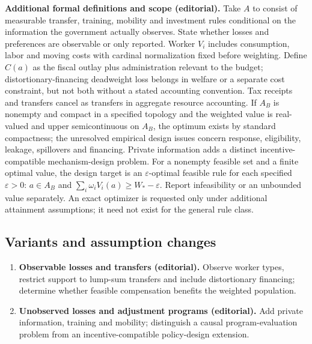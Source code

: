 \documentclass[11pt,a4paper]{article}
\begin{document}
\textbf{Additional formal definitions and scope (editorial).} Take \(A\) to consist of measurable transfer, training, mobility and investment rules conditional on the information the government actually observes. State whether losses and preferences are observable or only reported. Worker \(V_i\) includes consumption, labor and moving costs with cardinal normalization fixed before weighting. Define \(C(a)\) as the fiscal outlay plus administration relevant to the budget; distortionary-financing deadweight loss belongs in welfare or a separate cost constraint, but not both without a stated accounting convention. Tax receipts and transfers cancel as transfers in aggregate resource accounting. If \(A_B\) is nonempty and compact in a specified topology and the weighted value is real-valued and upper semicontinuous on \(A_B\), the optimum exists by standard compactness; the unresolved empirical design issues concern response, eligibility, leakage, spillovers and financing. Private information adds a distinct incentive-compatible mechanism-design problem. For a nonempty feasible set and a finite optimal value, the design target is an \(\varepsilon\)-optimal feasible rule for each specified \(\varepsilon>0\): \(a\in A_B\) and \(\sum_i\omega_iV_i(a)\geq W_*-\varepsilon\). Report infeasibility or an unbounded value separately. An exact optimizer is requested only under additional attainment assumptions; it need not exist for the general rule class.
\subsection*{Variants and assumption changes}
\begin{enumerate}
\item \textbf{Observable losses and transfers (editorial).} Observe worker types, restrict support to lump-sum transfers and include distortionary financing; determine whether feasible compensation benefits the weighted population.
\item \textbf{Unobserved losses and adjustment programs (editorial).} Add private information, training and mobility; distinguish a causal program-evaluation problem from an incentive-compatible policy-design extension.
\end{enumerate}
\end{document}
